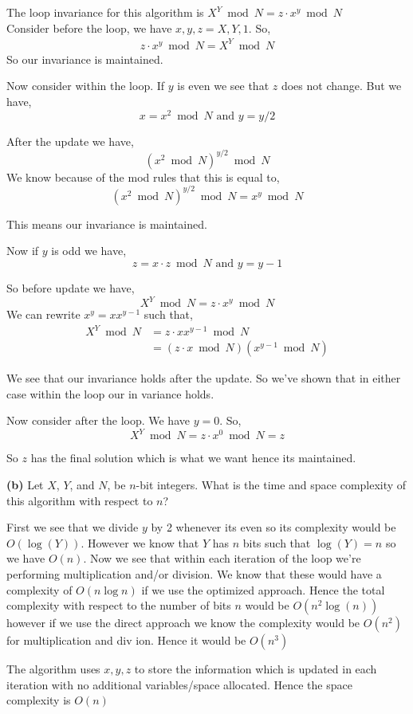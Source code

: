 \documentclass[12pt]{article}
\newcommand{\question}[3][Q]{
\begin{description}
\item \textbf{#1{#2}} #3
\end{description}
}
\begin{document}
\begin{answer}
    The loop invariance for this algorithm is $X^{Y} \bmod N = z \cdot x^{y} \bmod N$ \\
    Consider before the loop, we have $x,y,z =X,Y,1$. So,  
    \begin{align*}
        z \cdot x^{y}\bmod N =  X^{Y} \bmod N
    \end{align*}
    So our invariance is maintained.

    Now consider within the loop. If $y$ is even we see that $z$ does not change. But we have, 
    $$ x = x^2 \bmod N \text{ and } y = y /2 $$ 

    After the update we have, 
    $$ (x^2 \bmod N)^{y /2} \bmod N $$ 
    We know because of the mod rules that this is equal to, 
    $$ (x^2 \bmod N)^{y /2} \bmod N  = x^{y} \bmod N$$ 

    This means our invariance is maintained.

    Now if $y$ is odd we have, 
    $$ z = x \cdot z \bmod N \text{ and } y = y - 1 $$ 

    So before update we have, 
    $$ X^{Y} \bmod N = z \cdot x^{y}\bmod N$$ 
    We can rewrite $x^{y} = x x^{y - 1}$  such that, 
    \begin{align*}
        X^{Y} \bmod N &= z \cdot x x^{y - 1}\bmod N\\
                      &= (z \cdot x \bmod N) (x^{y - 1} \bmod N)
    \end{align*}

    We see that our invariance holds after the update. So we've shown that in either case within the loop our in variance holds. 


    Now consider after the loop. We have $y = 0$. So,  
    $$ X^{Y} \bmod N = z \cdot x^{0} \bmod N  = z$$

    So $z$ has the final solution which is what we want hence its maintained.
    

\end{answer}

\question[]{(b)}{
    Let $X$, $Y$, and $N$, be $n$-bit integers. What is the time and space complexity of this algorithm with respect to $n$?
}


\begin{answer}
    First we see that we divide $y$ by 2 whenever its even so its complexity would be $O(\log(Y))$. However we know that $Y$ has $n$ bits such that $\log(Y) = n$ so we have  $O(n)$. Now we see that within each iteration of the loop we're performing multiplication and/or division. We know that these would have a complexity of $O(n\log n)$ if we use the optimized approach. Hence the total complexity with respect to the number of bits $n$ would be $O(n^2 \log(n))$ however if we use the direct approach we know the complexity would be $O(n^2)$ for multiplication and div ion. Hence it would be $O(n^{3})$

    The algorithm uses $x,y,z$ to store the information which is updated in each iteration with no additional variables/space allocated. Hence the space complexity is $O(n)$
\end{answer}
\end{document}
